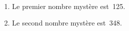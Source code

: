 \ \\ [-5mm]
   \begin{enumerate}
      \item Le premier nombre mystère est {\,125}.
      \item Le second nombre mystère est {\,348}.
   \end{enumerate}
